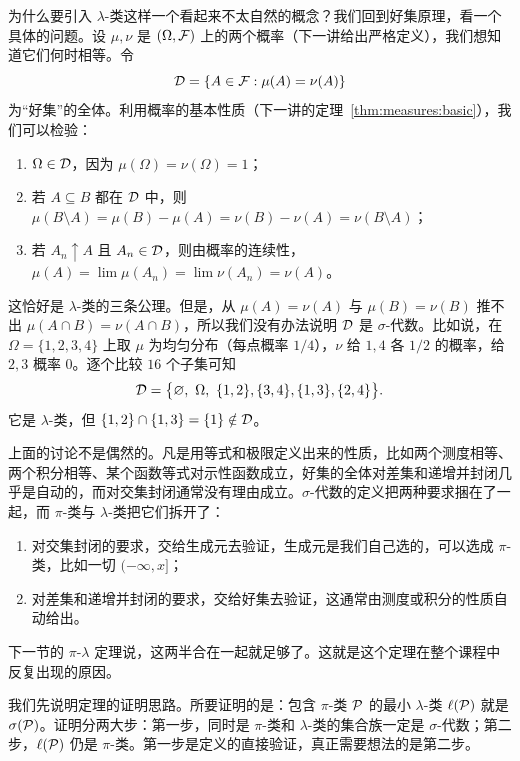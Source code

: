 为什么要引入 $\lambda$-类这样一个看起来不太自然的概念？我们回到好集原理，看一个具体的问题。设 $\mu,\nu$ 是 $(\Omega,\mathcal{F})$ 上的两个概率（下一讲给出严格定义），我们想知道它们何时相等。令
\[
\mathcal{D}=\{A\in\mathcal{F}: \mu(A)=\nu(A)\}
\]
为“好集”的全体。利用概率的基本性质（下一讲的定理~\ref{thm:measures:basic}），我们可以检验：
\begin{enumerate}
\item $\Omega\in\mathcal{D}$，因为 $\mu(\Omega)=\nu(\Omega)=1$；
\item 若 $A\subseteq B$ 都在 $\mathcal{D}$ 中，则 $\mu(B\setminus A)=\mu(B)-\mu(A)=\nu(B)-\nu(A)=\nu(B\setminus A)$；
\item 若 $A_n\uparrow A$ 且 $A_n\in\mathcal{D}$，则由概率的连续性，$\mu(A)=\lim\mu(A_n)=\lim\nu(A_n)=\nu(A)$。
\end{enumerate}
这恰好是 $\lambda$-类的三条公理。但是，从 $\mu(A)=\nu(A)$ 与 $\mu(B)=\nu(B)$ 推不出 $\mu(A\cap B)=\nu(A\cap B)$，所以我们没有办法说明 $\mathcal{D}$ 是 $\sigma$-代数。比如说，在 $\Omega=\{1,2,3,4\}$ 上取 $\mu$ 为均匀分布（每点概率 $1/4$），$\nu$ 给 $1,4$ 各 $1/2$ 的概率，给 $2,3$ 概率 $0$。逐个比较 $16$ 个子集可知
\[
\cD=\bigl\{\varnothing,\ \Omega,\ \{1,2\},\{3,4\},\{1,3\},\{2,4\}\bigr\}.
\]
它是 $\lambda$-类，但 $\{1,2\}\cap\{1,3\}=\{1\}\notin\mathcal{D}$。

\begin{remark}
上面的讨论不是偶然的。凡是用等式和极限定义出来的性质，比如两个测度相等、两个积分相等、某个函数等式对示性函数成立，好集的全体对差集和递增并封闭几乎是自动的，而对交集封闭通常没有理由成立。$\sigma$-代数的定义把两种要求捆在了一起，而 $\pi$-类与 $\lambda$-类把它们拆开了：
\begin{enumerate}
\item 对交集封闭的要求，交给生成元去验证，生成元是我们自己选的，可以选成 $\pi$-类，比如一切 $(-\infty,x]$；
\item 对差集和递增并封闭的要求，交给好集去验证，这通常由测度或积分的性质自动给出。
\end{enumerate}
下一节的 $\pi$-$\lambda$ 定理说，这两半合在一起就足够了。这就是这个定理在整个课程中反复出现的原因。
\end{remark}


我们先说明定理的证明思路。所要证明的是：包含 $\pi$-类 $\mathcal{P}$ 的最小 $\lambda$-类 $\ell(\mathcal{P})$ 就是 $\sigma(\mathcal{P})$。证明分两大步：第一步，同时是 $\pi$-类和 $\lambda$-类的集合族一定是 $\sigma$-代数；第二步，$\ell(\mathcal{P})$ 仍是 $\pi$-类。第一步是定义的直接验证，真正需要想法的是第二步。

